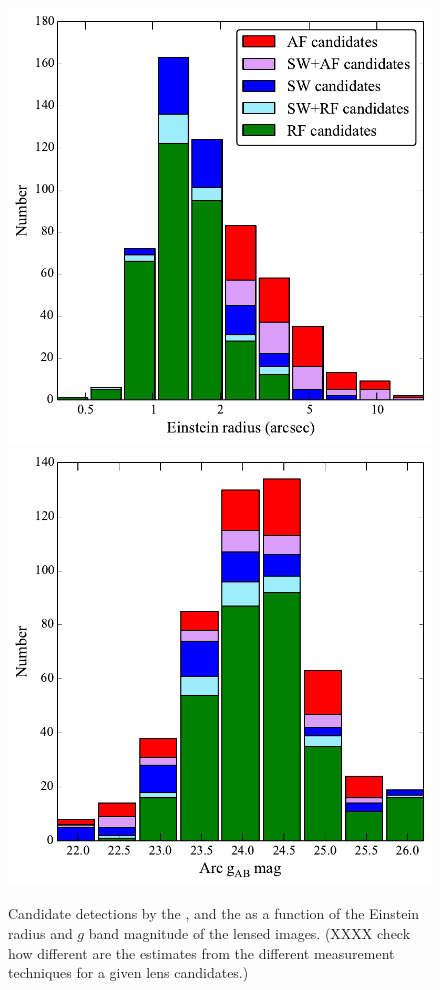 \documentclass[useAMS,usenatbib,a4paper]{mn2e}
\begin{document}
\begin{figure}
\begin{center}
\includegraphics[scale=0.5]{sw-cfhtls-figs/stacked_lenscand_rein.pdf}
\includegraphics[scale=0.5]{sw-cfhtls-figs/stacked_lenscand_mag.pdf}
\caption{ \label{fig:stackre}
Candidate detections by the \rf, \sw and the \af as a
function of the Einstein radius and $g$ band magnitude of the lensed
images. (XXXX check how different are the estimates from the different
measurement techniques for a given lens candidates.) }
\end{center}
\end{figure}
\end{document}
